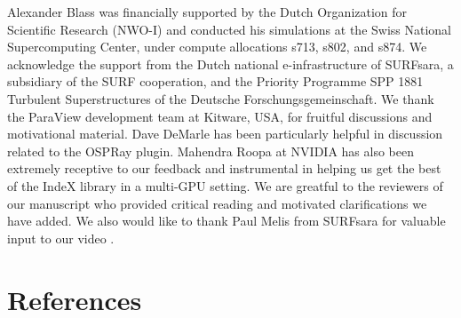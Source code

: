 \documentclass[5p,times]{elsarticle}
\begin{document}
Alexander Blass was financially supported by the Dutch Organization for Scientific Research (NWO-I) and conducted his simulations at the Swiss National Supercomputing Center, under compute allocations s713, s802, and s874. We acknowledge the support from the Dutch national e-infrastructure of SURFsara, a subsidiary of the SURF cooperation, and the Priority Programme SPP 1881 Turbulent Superstructures of the Deutsche Forschungsgemeinschaft. We thank the ParaView development team at Kitware, USA, for fruitful discussions and motivational material. Dave DeMarle has been particularly helpful in discussion related to the OSPRay plugin. Mahendra Roopa at NVIDIA has also been extremely receptive to our feedback and instrumental in helping us get the best of the IndeX library in a multi-GPU setting. We are greatful to the reviewers of our manuscript who provided critical reading and motivated clarifications we have added. We also would like to thank Paul Melis from SURFsara for valuable input to our video \cite{fav18}. 

\section*{References}
 

\end{document}
